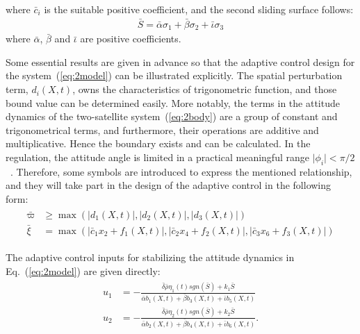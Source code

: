 where $\bar{c}_i$ is the suitable positive coefficient, and the second sliding surface follows:
\begin{align}
\bar{S} = \bar{\alpha}\sigma_1+ \bar{\beta}\sigma_2+\bar{\iota}\sigma_3\label{eq:bar S}
\end{align}
where $\bar{\alpha}$, $\bar{\beta}$ and $\bar{\iota}$ are positive coefficients.
\begin{remark}
Some essential results are given in advance so that the adaptive control design for the system~(\ref{eq:2model}) can be illustrated explicitly. The spatial perturbation term, $d_i(X,t)$, owns the characteristics of trigonometric function, and those bound value can be determined easily. More notably, the terms in the attitude dynamics of the two-satellite system~(\ref{eq:2body}) are a group of constant and trigonometrical terms, and furthermore, their operations are additive and multiplicative. Hence the boundary exists and can be calculated. In the regulation, the attitude angle is limited in a practical meaningful range $\vert \phi_i\vert<\pi/2$~\cite{chung2008propellant2}. Therefore, some symbols are introduced to express the mentioned relationship, and they will take part in the design of the adaptive control in the following form:\label{rem:2}
\begin{align}
\begin{split}
\bar\varpi &\ge \max(\vert d_1(X,t)\vert,\vert d_2(X,t)\vert,\vert d_3(X,t)\vert)\\
\bar\xi &=  \max(\vert \bar c_1x_2 + f_1(X,t)\vert,\vert \bar c_2x_4 + f_2(X,t)\vert,\vert \bar c_3x_6 + f_3(X,t)\vert)
\end{split}
\end{align}
\end{remark}\par
The adaptive control inputs for stabilizing the attitude dynamics in Eq.~(\ref{eq:2model}) are given directly:
\begin{align}
\begin{split}
u_1 &= -\frac{\bar\delta\bar\rho\eta_1(t)sgn(\bar S)+k_1\bar S}{\bar\alpha b_1(X,t) + \bar\beta b_3(X,t) + \bar\iota b_5(X,t)}\\
u_2 &= -\frac{\bar\delta\bar\rho\eta_2(t)sgn(\bar S)+k_2\bar S}{\bar\alpha b_2(X,t) + \bar\beta b_4(X,t) + \bar\iota b_6(X,t)}.
\end{split}\label{eq:u1u2}
\end{align}\par
